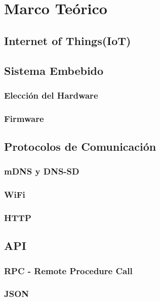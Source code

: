 
\chapter{Marco Teórico} %

\label{Chapter2} %


\section{Internet of Things(IoT)}

\section{Sistema Embebido}
\subsection{Elección del Hardware}
\subsection{Firmware}

\section{Protocolos de Comunicación}
\subsection{mDNS y DNS-SD}
\subsection{WiFi}
\subsection{HTTP}
\section{API}
\subsection{RPC - Remote Procedure Call}
\subsection{JSON}
